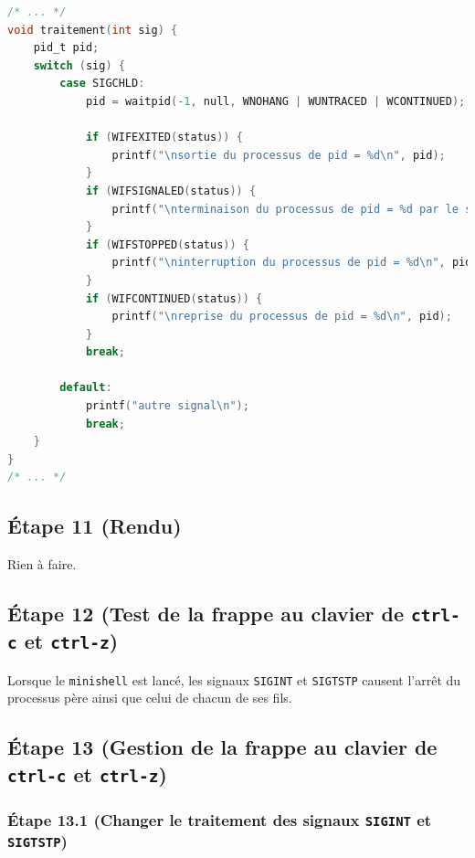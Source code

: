 \documentclass{article}
\begin{document}
\begin{lstlisting}[language=C, caption=ajout de la question 10]
/* ... */
void traitement(int sig) {
    pid_t pid;
    switch (sig) {
        case SIGCHLD:
            pid = waitpid(-1, null, WNOHANG | WUNTRACED | WCONTINUED);

            if (WIFEXITED(status)) {
                printf("\nsortie du processus de pid = %d\n", pid);
            }
            if (WIFSIGNALED(status)) {
                printf("\nterminaison du processus de pid = %d par le signal %d\n", pid, sig);
            }
            if (WIFSTOPPED(status)) {
                printf("\ninterruption du processus de pid = %d\n", pid);
            }
            if (WIFCONTINUED(status)) {
                printf("\nreprise du processus de pid = %d\n", pid);
            }
            break;

        default:
            printf("autre signal\n");
            break;
    }
}
/* ... */
\end{lstlisting}

\subsection*{Étape 11 (Rendu)}

Rien à faire.

\subsection*{Étape 12 (Test de la frappe au clavier de \texttt{ctrl-c} et \texttt{ctrl-z})}

Lorsque le \texttt{minishell} est lancé, les signaux \texttt{SIGINT} et \texttt{SIGTSTP} causent l'arrêt du processus père ainsi que celui de chacun de ses fils.

\subsection*{Étape 13 (Gestion de la frappe au clavier de \texttt{ctrl-c} et \texttt{ctrl-z})}

\subsubsection*{Étape 13.1 (Changer le traitement des signaux \texttt{SIGINT} et \texttt{SIGTSTP})}
\end{document}
